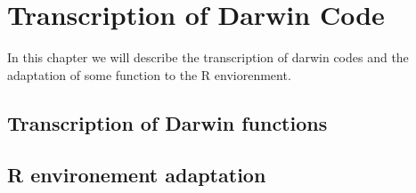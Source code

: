 \chapter{Transcription of Darwin Code}
In this chapter we will describe the transcription of darwin codes and the adaptation of some function to the R enviorenment.


\section{Transcription of Darwin functions}

\section{R environement adaptation}